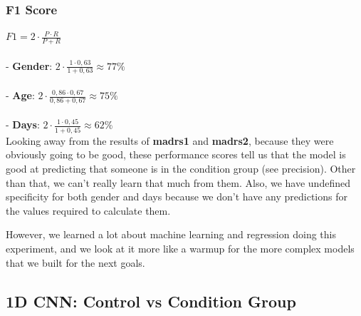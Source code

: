 \subsubsection{F1 Score}
$ F1 = 2 \cdot \frac{P \cdot R}{P + R} $
\\\\
- \textbf{Gender}: $2 \cdot \frac{1 \cdot 0,63}{1 + 0,63} \approx 77\%$\\\\
- \textbf{Age}: $2 \cdot \frac{0,86 \cdot 0,67}{0,86 + 0,67} \approx 75\%$\\\\
- \textbf{Days}: $2 \cdot \frac{1 \cdot 0,45}{1 + 0,45} \approx 62\%$\\

Looking away from the results of \textbf{madrs1} and \textbf{madrs2}, because they were obviously going to be good, these performance scores tell us that the model 
is good at predicting that someone is in the condition group (see precision). Other than that, we can't really learn that much from them. 
Also, we have undefined specificity for both gender and days because we don't have any predictions for the values required to calculate them. 

However, we learned a lot about machine learning and regression doing this experiment, and we look at it more like a warmup for the more complex models that we built 
for the next goals.

\subsection{1D CNN: Control vs Condition Group}


